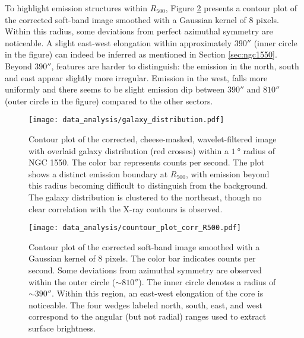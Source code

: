 To highlight emission structures within \(R_{500}\), Figure \ref{fig:contour_fully_corrected} presents a contour plot of the corrected soft-band image smoothed with a Gaussian kernel of \(8\) pixels. Within this radius, some deviations from perfect azimuthal symmetry are noticeable. A slight east-west elongation within approximately \(390''\) (inner circle in the figure) can indeed be inferred as mentioned in Section \ref{sec:ngc1550}. Beyond \(390''\), features are harder to distinguish: the emission in the north, south and east appear slightly more irregular. Emission in the west, falls more uniformly and there seems to be slight emission dip between \(390''\) and \(810''\) (outer circle in the figure) compared to the other sectors.
\begin{figure}[htbp]
    \centering
    \texttt{[image: data\_analysis/galaxy\_distribution.pdf]}
    \caption{Contour plot of the corrected, cheese-masked, wavelet-filtered image with overlaid galaxy distribution (red crosses) within a \(\SI{1}{\degree}\) radius of NGC 1550. The color bar represents counts per second. The plot shows a distinct emission boundary at \(R_{500}\), with emission beyond this radius becoming difficult to distinguish from the background. The galaxy distribution is clustered to the northeast, though no clear correlation with the X-ray contours is observed.}
    \label{fig:contour_wvl_filtered}
\end{figure}
\begin{figure}[htbp]
    \centering
    \texttt{[image: data\_analysis/countour\_plot\_corr\_R500.pdf]}
    \caption{Contour plot of the corrected soft-band image smoothed with a Gaussian kernel of 8 pixels. The color bar indicates counts per second. Some deviations from azimuthal symmetry are observed within the outer circle (\(\sim 810''\)). The inner circle denotes a radius of \(\sim 390''\). Within this region, an east-west elongation of the core is noticeable. The four wedges labeled north, south, east, and west correspond to the angular (but not radial) ranges used to extract surface brightness.}
    \label{fig:contour_fully_corrected}
\end{figure}
